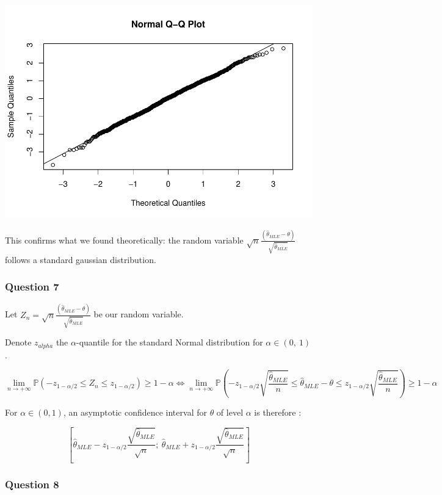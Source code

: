 \documentclass[]{article}
\begin{document}
\includegraphics{Homework_Adrien_Toulouse_Paul-Antoine_Girard_files/figure-latex/unnamed-chunk-3-1.pdf}

This confirms what we found theoretically: the random variable
\(\sqrt{n}\frac{(\hat\theta_{MLE}-\theta)}{\sqrt{\hat\theta_{MLE}}}\)
follows a standard gaussian distribution.

\hypertarget{question-7}{%
\subsubsection{Question 7}\label{question-7}}

Let
\(Z_n = \sqrt{n} \frac{(\hat\theta_{MLE}-\theta)}{\sqrt{\hat\theta_{MLE}}}\)
be our random variable.

Denote \(z_{alpha}\) the \(\alpha\)-quantile for the standard Normal
distribution for \(\alpha \in (0,\ 1)\).

\[
\lim \limits_{n \rightarrow + \infty} \mathbb{P} (-z_{1-\alpha/2} \leq Z_n \leq z_{1-\alpha/2}) \ge 1- \alpha \Leftrightarrow \lim \limits_{n \rightarrow + \infty} \mathbb{P}(-z_{1-\alpha/2} \sqrt{\frac{\hat\theta_{MLE}}{n}} \leq \hat\theta_{MLE} - \theta \leq z_{1-\alpha/2}\sqrt{\frac{\hat\theta_{MLE}}{n}}) \ge 1- \alpha
\]

For \(\alpha \in (0, 1)\), an asymptotic confidence interval for
\(\theta\) of level \(\alpha\) is therefore :

\[
[\hat \theta_{MLE} - z_{1-\alpha/2} \frac{\sqrt{\hat\theta_{MLE}}}{\sqrt{n}} ;\ \hat \theta_{MLE} + z_{1-\alpha/2} \frac{\sqrt{\hat\theta_{MLE}}} {\sqrt{n}}]
\]

\hypertarget{question-8}{%
\subsubsection{Question 8}\label{question-8}}
\end{document}
